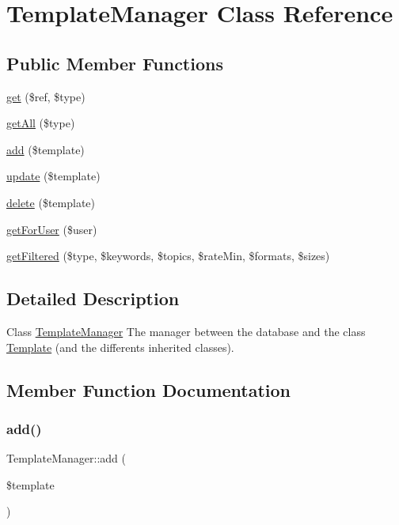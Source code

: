 \hypertarget{classTemplateManager}{}\section{Template\+Manager Class Reference}
\label{classTemplateManager}
\subsection*{Public Member Functions}
\begin{DoxyCompactItemize}
\item 
\hyperlink{classTemplateManager_a12dabaa21a3a27bc84296627df2d6349}{get} (\$ref, \$type)
\item 
\hyperlink{classTemplateManager_a387cb638f6a35fe5db4786e35502ae8d}{get\+All} (\$type)
\item 
\hyperlink{classTemplateManager_a32ada078a7364af82f6ffad464362164}{add} (\$template)
\item 
\hyperlink{classTemplateManager_a131e2efc260d40bbf939dc11676ddf98}{update} (\$template)
\item 
\hyperlink{classTemplateManager_a6ef7f84fdea7c33b88e4a11df061ff32}{delete} (\$template)
\item 
\hyperlink{classTemplateManager_a51e5e8c435403032aaada0ebdb846070}{get\+For\+User} (\$user)
\item 
\hyperlink{classTemplateManager_add74211b79e636840d1ce1de348d1036}{get\+Filtered} (\$type, \$keywords, \$topics, \$rate\+Min, \$formats, \$sizes)
\end{DoxyCompactItemize}


\subsection{Detailed Description}
Class \hyperlink{classTemplateManager}{Template\+Manager} The manager between the database and the class \hyperlink{classTemplate}{Template} (and the differents inherited classes). 

\subsection{Member Function Documentation}
\mbox{\label{classTemplateManager_a32ada078a7364af82f6ffad464362164}} 
\subsubsection{\texorpdfstring{add()}{add()}}
{\footnotesize\ttfamily Template\+Manager\+::add (\begin{DoxyParamCaption}\item[{}]{\$template }\end{DoxyParamCaption})}

